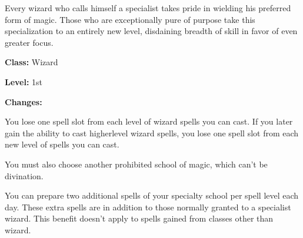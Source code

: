 
Every wizard who calls himself a specialist takes pride in wielding his preferred form of magic. Those who are exceptionally pure of purpose take this specialization to an entirely new level, disdaining breadth of skill in favor of even greater focus.

\textbf{Class:} Wizard

\textbf{Level:} 1st

\textbf{Changes:}

\begin{itemize*}
\item You lose one spell slot from each level of wizard spells you can cast. If you later gain the ability to cast higherlevel wizard spells, you lose one spell slot from each new level of spells you can cast.
\item You must also choose another prohibited school of magic, which can't be divination.
\item You can prepare two additional spells of your specialty school per spell level each day. These extra spells are in addition to those normally granted to a specialist wizard. This benefit doesn't apply to spells gained from classes other than wizard.
\end{itemize*}